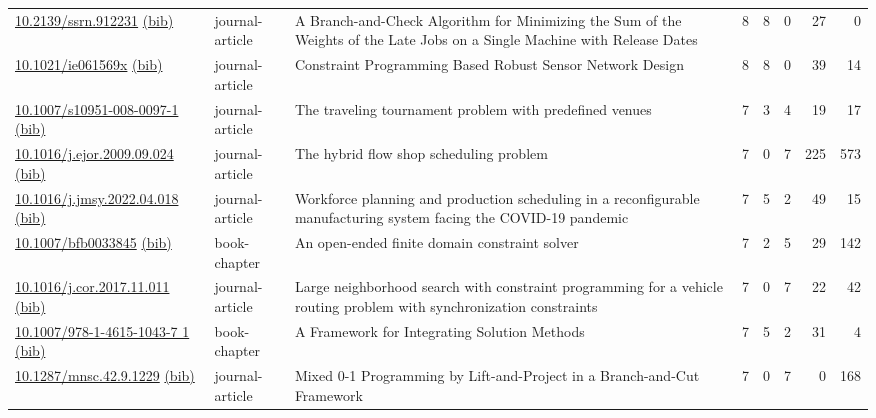 {\begin{longtable}{p{5cm}lp{11cm}rrrrr}
\href{http://dx.doi.org/10.2139/ssrn.912231}{10.2139/ssrn.912231} \href{https://www.doi2bib.org/bib/10.2139/ssrn.912231}{(bib)} & journal-article & A Branch-and-Check Algorithm for Minimizing the Sum of the Weights of the Late Jobs on a Single Machine with Release Dates & 8 & 8 & 0 & 27 & 0 \\
\href{http://dx.doi.org/10.1021/ie061569x}{10.1021/ie061569x} \href{https://www.doi2bib.org/bib/10.1021/ie061569x}{(bib)} & journal-article & Constraint Programming Based Robust Sensor Network Design & 8 & 8 & 0 & 39 & 14 \\
\href{http://dx.doi.org/10.1007/s10951-008-0097-1}{10.1007/s10951-008-0097-1} \href{https://www.doi2bib.org/bib/10.1007/s10951-008-0097-1}{(bib)} & journal-article & The traveling tournament problem with predefined venues & 7 & 3 & 4 & 19 & 17 \\
\href{http://dx.doi.org/10.1016/j.ejor.2009.09.024}{10.1016/j.ejor.2009.09.024} \href{https://www.doi2bib.org/bib/10.1016/j.ejor.2009.09.024}{(bib)} & journal-article & The hybrid flow shop scheduling problem & 7 & 0 & 7 & 225 & 573 \\
\href{http://dx.doi.org/10.1016/j.jmsy.2022.04.018}{10.1016/j.jmsy.2022.04.018} \href{https://www.doi2bib.org/bib/10.1016/j.jmsy.2022.04.018}{(bib)} & journal-article & Workforce planning and production scheduling in a reconfigurable manufacturing system facing the COVID-19 pandemic & 7 & 5 & 2 & 49 & 15 \\
\href{http://dx.doi.org/10.1007/bfb0033845}{10.1007/bfb0033845} \href{https://www.doi2bib.org/bib/10.1007/bfb0033845}{(bib)} & book-chapter & An open-ended finite domain constraint solver & 7 & 2 & 5 & 29 & 142 \\
\href{http://dx.doi.org/10.1016/j.cor.2017.11.011}{10.1016/j.cor.2017.11.011} \href{https://www.doi2bib.org/bib/10.1016/j.cor.2017.11.011}{(bib)} & journal-article & Large neighborhood search with constraint programming for a vehicle routing problem with synchronization constraints & 7 & 0 & 7 & 22 & 42 \\
\href{http://dx.doi.org/10.1007/978-1-4615-1043-7_1}{10.1007/978-1-4615-1043-7 1} \href{https://www.doi2bib.org/bib/10.1007/978-1-4615-1043-7_1}{(bib)} & book-chapter & A Framework for Integrating Solution Methods & 7 & 5 & 2 & 31 & 4 \\
\href{http://dx.doi.org/10.1287/mnsc.42.9.1229}{10.1287/mnsc.42.9.1229} \href{https://www.doi2bib.org/bib/10.1287/mnsc.42.9.1229}{(bib)} & journal-article & Mixed 0-1 Programming by Lift-and-Project in a Branch-and-Cut Framework & 7 & 0 & 7 & 0 & 168 \\

\end{longtable}}
